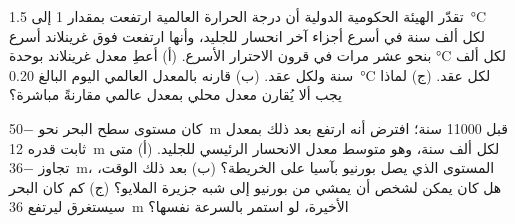 \begin{exercise}[$\star\star\star$]\label{exo:g12:past-climates:14}
تقدّر الهيئة الحكومية الدولية أن درجة الحرارة العالمية ارتفعت بمقدار 1 إلى
\qty{1.5}{\degreeCelsius} لكل ألف سنة في أسرع أجزاء آخر
انحسار للجليد، وأنها ارتفعت فوق غرينلاند أسرع بنحو عشر مرات في
قرون الاحترار الأسرع. (أ) أعطِ معدل غرينلاند بوحدة
\unit{\degreeCelsius} لكل ألف سنة ولكل عقد. (ب) قارنه
بالمعدل العالمي اليوم البالغ \qty{0.20}{\degreeCelsius} لكل عقد. (ج) لماذا يجب ألا
يُقارن معدل محلي بمعدل عالمي مقارنةً مباشرة؟
\end{exercise}

\begin{exercise}[$\star\star\star$]\label{exo:g12:past-climates:15}
كان مستوى سطح البحر نحو \qty{-50}{m} قبل \num{11000} سنة؛ افترض أنه
ارتفع بعد ذلك بمعدل ثابت قدره \qty{12}{m} لكل ألف سنة، وهو متوسط معدل
الانحسار الرئيسي للجليد. (أ) متى تجاوز \qty{-36}{m}، المستوى الذي يصل بورنيو
بآسيا على الخريطة؟ (ب) بعد ذلك الوقت، هل كان يمكن لشخص أن يمشي من بورنيو إلى
شبه جزيرة الملايو؟ (ج) كم كان البحر سيستغرق ليرتفع
\qty{36}{m} الأخيرة، لو استمر بالسرعة نفسها؟
\end{exercise}


